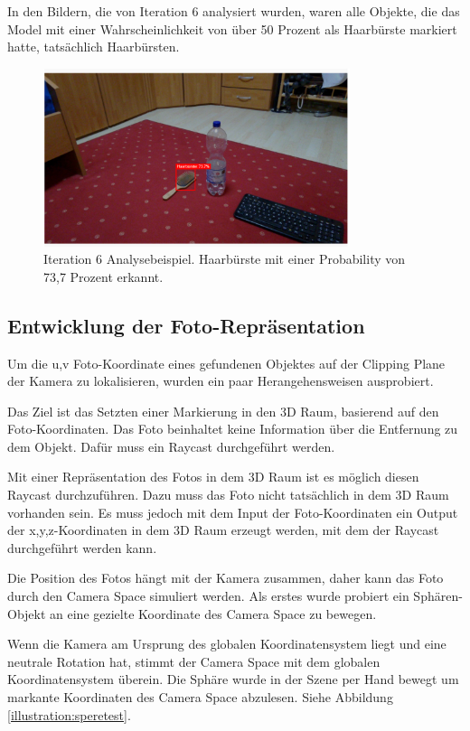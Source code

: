 In den Bildern, die von Iteration 6 analysiert wurden, waren alle Objekte, die das Model mit einer Wahrscheinlichkeit von über 50 Prozent als Haarbürste markiert hatte, tatsächlich Haarbürsten.

\begin{figure}[H]
	\centering
	\includegraphics[width=0.8\textwidth]{images/it6pretty.png}
	\caption[Iteration 6 Analysebeispiel]{Iteration 6 Analysebeispiel. Haarbürste mit einer Probability von 73,7 Prozent erkannt.}
	\label{img:it6}
\end{figure}


\subsection{Entwicklung der Foto-Repräsentation}
\label{section:devpixeltoworld}

Um die u,v Foto-Koordinate eines gefundenen Objektes auf der Clipping Plane der Kamera zu lokalisieren, wurden ein paar Herangehensweisen ausprobiert.

Das Ziel ist das Setzten einer Markierung in den 3D Raum, basierend auf den Foto-Koordinaten. Das Foto beinhaltet keine Information über die Entfernung zu dem Objekt. Dafür muss ein Raycast durchgeführt werden. 

Mit einer Repräsentation des Fotos in dem 3D Raum ist es möglich diesen Raycast durchzuführen. 
Dazu muss das Foto nicht tatsächlich in dem 3D Raum vorhanden sein. Es muss jedoch mit dem Input der Foto-Koordinaten ein Output der x,y,z-Koordinaten in dem 3D Raum erzeugt werden, mit dem der Raycast durchgeführt werden kann.

Die Position des Fotos hängt mit der Kamera zusammen, daher kann das Foto durch den Camera Space simuliert werden. Als erstes wurde probiert ein Sphären-Objekt an eine gezielte Koordinate des Camera Space zu bewegen. 

Wenn die Kamera am Ursprung des globalen Koordinatensystem liegt und eine neutrale Rotation hat, stimmt der Camera Space mit dem globalen Koordinatensystem überein. Die Sphäre wurde in der Szene per Hand bewegt um markante Koordinaten des Camera Space abzulesen. Siehe Abbildung \ref{illustration:speretest}.

